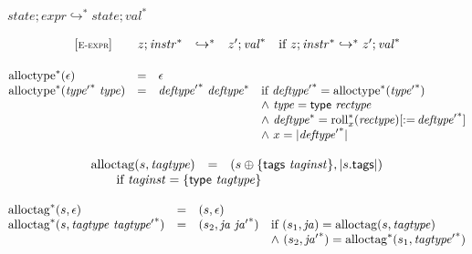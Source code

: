 \vspace{1ex}

$\boxed{{\mathit{state}} ; {\mathit{expr}} \hookrightarrow^\ast {\mathit{state}} ; {{\mathit{val}}^\ast}}$

$$
\begin{array}[t]{@{}lrcl@{}l@{}}
{[\textsc{\scriptsize E{-}expr}]} \quad & z ; {{\mathit{instr}}^\ast} & \hookrightarrow^\ast & {z'} ; {{\mathit{val}}^\ast} & \quad \mbox{if}~ z ; {{\mathit{instr}}^\ast} \hookrightarrow^\ast {z'} ; {{\mathit{val}}^\ast} \\
\end{array}
$$

\vspace{1ex}

$$
\begin{array}[t]{@{}lcl@{}l@{}}
{{{\mathrm{alloctype}}^\ast}}{(\epsilon)} & = & \epsilon \\
{{{\mathrm{alloctype}}^\ast}}{({{\mathit{type}'}^\ast}~{\mathit{type}})} & = & {{\mathit{deftype}'}^\ast}~{{\mathit{deftype}}^\ast} & \quad
\begin{array}[t]{@{}l@{}}
\mbox{if}~ {{\mathit{deftype}'}^\ast} = {{{\mathrm{alloctype}}^\ast}}{({{\mathit{type}'}^\ast})} \\
{\land}~ {\mathit{type}} = \mathsf{type}~{\mathit{rectype}} \\
{\land}~ {{\mathit{deftype}}^\ast} = {{{{{\mathrm{roll}}}_{x}^\ast}}{({\mathit{rectype}})}}{{}[ {:=}\, {{\mathit{deftype}'}^\ast} ]} \\
{\land}~ x = {|{{\mathit{deftype}'}^\ast}|} \\
\end{array} \\
\end{array}
$$

$$
\begin{array}[t]{@{}lcl@{}l@{}}
{\mathrm{alloctag}}(s, {\mathit{tagtype}}) & = & (s \oplus \{ \mathsf{tags}~{\mathit{taginst}} \}, {|s{.}\mathsf{tags}|}) &  \\
 \multicolumn{4}{@{}l@{}}{\quad
\quad \mbox{if}~ {\mathit{taginst}} = \{ \mathsf{type}~{\mathit{tagtype}} \}
} \\
\end{array}
$$

$$
\begin{array}[t]{@{}lcl@{}l@{}}
{{{\mathrm{alloctag}}^\ast}}{(s, \epsilon)} & = & (s, \epsilon) \\
{{{\mathrm{alloctag}}^\ast}}{(s, {\mathit{tagtype}}~{{\mathit{tagtype}'}^\ast})} & = & (s_2, {\mathit{ja}}~{{\mathit{ja}'}^\ast}) & \quad
\begin{array}[t]{@{}l@{}}
\mbox{if}~ (s_1, {\mathit{ja}}) = {\mathrm{alloctag}}(s, {\mathit{tagtype}}) \\
{\land}~ (s_2, {{\mathit{ja}'}^\ast}) = {{{\mathrm{alloctag}}^\ast}}{(s_1, {{\mathit{tagtype}'}^\ast})} \\
\end{array} \\
\end{array}
$$

